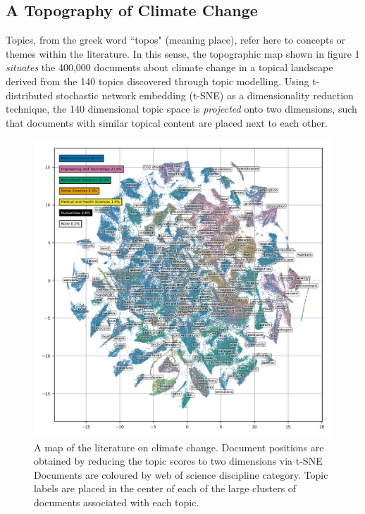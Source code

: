 \documentclass{article}
\begin{document}
\begin{linenumbers}
\subsection*{A Topography of Climate Change}

Topics, from the greek word ``topos" (meaning place), refer here to concepts or themes within the literature. In this sense, the topographic map shown in figure 1 \textit{situates} the 400,000 documents about climate change in a topical landscape derived from the 140 topics discovered through topic modelling. Using t-distributed stochastic network embedding (t-SNE)\cite{vandermaaten2008} as a dimensionality reduction technique, the 140 dimensional topic space is \textit{projected} onto two dimensions, such that documents with similar topical content are placed next to each other.

\begin{figure}
	\begin{center}
		\includegraphics[width=180mm]{tsne_results/plots/run_1861_s_0_p100_all_topic_words_oecds.png}
		\caption{A map of the literature on climate change. Document positions are obtained by reducing the topic scores to two dimensions via t-SNE Documents are coloured by web of science discipline category. Topic labels are placed in the center of each of the large clusters of documents associated with each topic. }
		\label{oecd_topic_map}
	\end{center}
\end{figure}


\end{linenumbers}
\end{document}
